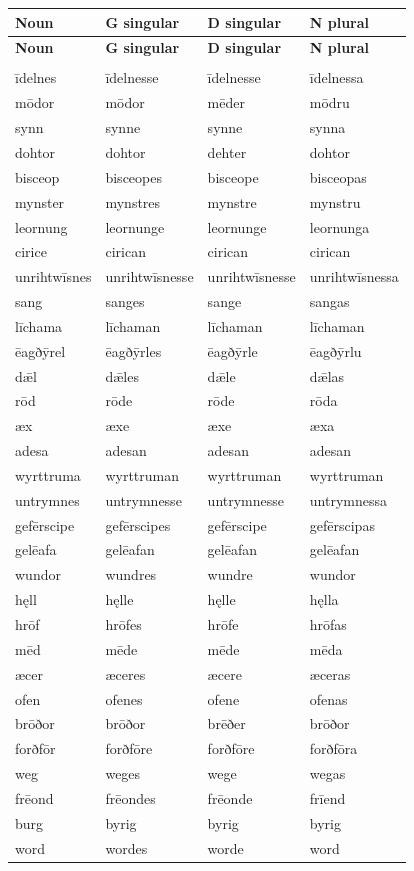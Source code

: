 \par\addvspace{5pt}
\setlength{\LTleft}{0pt}\setlength{\LTright}{\fill}
\begin{longtable}{@{}>{\raggedright\arraybackslash}p{31mm}>{\raggedright\arraybackslash}p{29mm}>{\raggedright\arraybackslash}p{29mm}>{\raggedright\arraybackslash}p{26.56mm}@{}}
\toprule
\textbf{Noun} & \textbf{G singular} & \textbf{D singular} & \textbf{N plural} \\
\midrule
\endfirsthead
\toprule
\textbf{Noun} & \textbf{G singular} & \textbf{D singular} & \textbf{N plural} \\
\midrule
\endhead
\midrule
\multicolumn{4}{r}{\footnotesize Continued on the following page.}\\
\endfoot
\bottomrule
\endlastfoot
īdelnes & īdelnesse & īdelnesse & īdelnessa \\
mōdor & mōdor & mēder & mōdru \\
synn & synne & synne & synna \\
dohtor & dohtor & dehter & dohtor \\
bisceop & bisceopes & bisceope & bisceopas \\
mynster & mynstres & mynstre & mynstru \\
leornung & leornunge & leornunge & leornunga \\
cirice & cirican & cirican & cirican \\
unrihtwīsnes & unrihtwīsnesse & unrihtwīsnesse & unrihtwīsnessa \\
sang & sanges & sange & sangas \\
līchama & līchaman & līchaman & līchaman \\
ēagðȳrel & ēagðȳrles & ēagðȳrle & ēagðȳrlu \\
dǣl & dǣles & dǣle & dǣlas \\
rōd & rōde & rōde & rōda \\
æx & æxe & æxe & æxa \\
adesa & adesan & adesan & adesan \\
wyrttruma & wyrttruman & wyrttruman & wyrttruman \\
untrymnes & untrymnesse & untrymnesse & untrymnessa \\
gefērscipe & gefērscipes & gefērscipe & gefērscipas \\
gelēafa & gelēafan & gelēafan & gelēafan \\
wundor & wundres & wundre & wundor \\
hęll & hęlle & hęlle & hęlla \\
hrōf & hrōfes & hrōfe & hrōfas \\
mēd & mēde & mēde & mēda \\
æcer & æceres & æcere & æceras \\
ofen & ofenes & ofene & ofenas \\
brōðor & brōðor & brēðer & brōðor \\
forðfōr & forðfōre & forðfōre & forðfōra \\
weg & weges & wege & wegas \\
frēond & frēondes & frēonde & frīend \\
burg & byrig & byrig & byrig \\
word & wordes & worde & word \\
\end{longtable}
